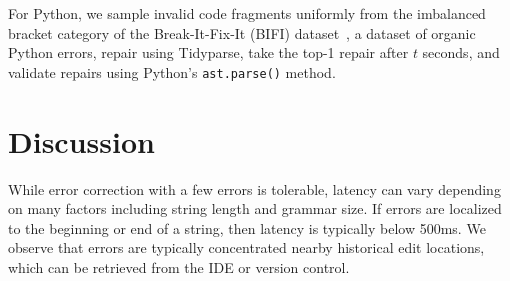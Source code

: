 \documentclass[sigplan,review,anonymous,acmsmall]{acmart}\settopmatter{printfolios=false,printccs=false,printacmref=false}
\begin{document}
\noindent For Python, we sample invalid code fragments uniformly from the imbalanced bracket category of the Break-It-Fix-It (BIFI) dataset~\cite{yasunaga2021break}, a dataset of organic Python errors, repair using Tidyparse, take the top-1 repair after $t$ seconds, and validate repairs using Python's \texttt{ast.parse()} method.

%
%
%
%
%
%

\pagebreak\section{Discussion}\label{sec:discussion}

While error correction with a few errors is tolerable, latency can vary depending on many factors including string length and grammar size. If errors are localized to the beginning or end of a string, then latency is typically below 500ms. We observe that errors are typically concentrated nearby historical edit locations, which can be retrieved from the IDE or version control.
\end{document}
